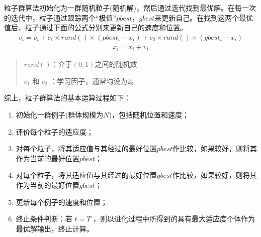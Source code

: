 \documentclass[letterpaper,10pt,english]{sphinxmanual}
\begin{document}
\sphinxAtStartPar
粒子群算法初始化为一群随机粒子(随机解)，然后通过迭代找到最优解。在每一次的迭代中，粒子通过跟踪两个“极值”\(pbest，gbest\)来更新自己。在找到这两个最优值后，粒子通过下面的公式分别来更新自己的速度和位置。
\begin{equation*}
\begin{split}    v_i=v_i+c_1\times rand()\times (pbest_i-x_i)+c_2\times rand()\times (gbest_i-x_i)\end{split}
\end{equation*}\begin{equation*}
\begin{split}    x_i=x_i+v_i\end{split}
\end{equation*}\begin{quote}

\sphinxAtStartPar
\(rand()\)：介于\((0,1)\)之间的随机数

\sphinxAtStartPar
\(c_1\) 和 \(c_2\) ：学习因子，通常均设为2。
\end{quote}

\sphinxAtStartPar


\sphinxAtStartPar
{}





\sphinxAtStartPar
综上，粒子群算法的基本运算过程如下：
\begin{enumerate}
%
\item {} 
\sphinxAtStartPar
初始化一群例子(群体规模为\(N\))，包括随机位置和速度；

\item {} 
\sphinxAtStartPar
评价每个粒子的适应度；

\item {} 
\sphinxAtStartPar
对每个粒子，将其适应值与其经过的最好位置\(pbest\)作比较，如果较好，则将其作为当前的最好位置\(pbest\)；

\item {} 
\sphinxAtStartPar
对每个粒子，将其适应值与其经过的最好位置\(gbest\)作比较，如果较好，则将其作为当前的最好位置\(gbest\)；

\item {} 
\sphinxAtStartPar
更新每个例子的速度和位置；

\item {} 
\sphinxAtStartPar
终止条件判断：若 \(t=T\) ，则以进化过程中所得到的具有最大适应度个体作为最优解输出，终止计算。

\end{enumerate}
\end{document}
